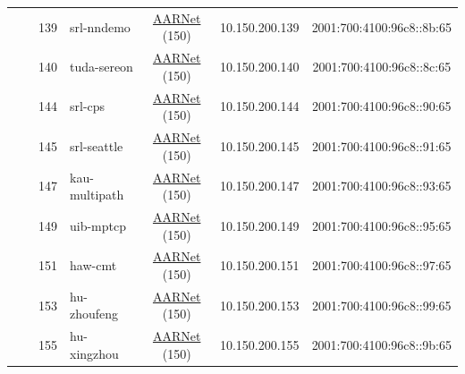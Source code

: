 \begin{small}
\begin{center}
\begin{longtable}{|c|c|c|c|c|c|c|c|}
  &  & \tiny{139} & \multicolumn{1}{|l|}{\tiny{srl-nndemo}} & \multicolumn{2}{|c|}{\tiny{\href{https://www.aarnet.edu.au/}{AARNet} (150)}} & \tiny{10.150.200.139} & \tiny{2001:700:4100:96c8::8b:65} \\* \cline{3-3}\cline{4-4}\cline{5-5}\cline{6-6}\cline{7-7}\cline{8-8}
  &  & \tiny{140} & \multicolumn{1}{|l|}{\tiny{tuda-sereon}} & \multicolumn{2}{|c|}{\tiny{\href{https://www.aarnet.edu.au/}{AARNet} (150)}} & \tiny{10.150.200.140} & \tiny{2001:700:4100:96c8::8c:65} \\* \cline{3-3}\cline{4-4}\cline{5-5}\cline{6-6}\cline{7-7}\cline{8-8}
  &  & \tiny{144} & \multicolumn{1}{|l|}{\tiny{srl-cps}} & \multicolumn{2}{|c|}{\tiny{\href{https://www.aarnet.edu.au/}{AARNet} (150)}} & \tiny{10.150.200.144} & \tiny{2001:700:4100:96c8::90:65} \\* \cline{3-3}\cline{4-4}\cline{5-5}\cline{6-6}\cline{7-7}\cline{8-8}
  &  & \tiny{145} & \multicolumn{1}{|l|}{\tiny{srl-seattle}} & \multicolumn{2}{|c|}{\tiny{\href{https://www.aarnet.edu.au/}{AARNet} (150)}} & \tiny{10.150.200.145} & \tiny{2001:700:4100:96c8::91:65} \\* \cline{3-3}\cline{4-4}\cline{5-5}\cline{6-6}\cline{7-7}\cline{8-8}
  &  & \tiny{147} & \multicolumn{1}{|l|}{\tiny{kau-multipath}} & \multicolumn{2}{|c|}{\tiny{\href{https://www.aarnet.edu.au/}{AARNet} (150)}} & \tiny{10.150.200.147} & \tiny{2001:700:4100:96c8::93:65} \\* \cline{3-3}\cline{4-4}\cline{5-5}\cline{6-6}\cline{7-7}\cline{8-8}
  &  & \tiny{149} & \multicolumn{1}{|l|}{\tiny{uib-mptcp}} & \multicolumn{2}{|c|}{\tiny{\href{https://www.aarnet.edu.au/}{AARNet} (150)}} & \tiny{10.150.200.149} & \tiny{2001:700:4100:96c8::95:65} \\* \cline{3-3}\cline{4-4}\cline{5-5}\cline{6-6}\cline{7-7}\cline{8-8}
  &  & \tiny{151} & \multicolumn{1}{|l|}{\tiny{haw-cmt}} & \multicolumn{2}{|c|}{\tiny{\href{https://www.aarnet.edu.au/}{AARNet} (150)}} & \tiny{10.150.200.151} & \tiny{2001:700:4100:96c8::97:65} \\* \cline{3-3}\cline{4-4}\cline{5-5}\cline{6-6}\cline{7-7}\cline{8-8}
  &  & \tiny{153} & \multicolumn{1}{|l|}{\tiny{hu-zhoufeng}} & \multicolumn{2}{|c|}{\tiny{\href{https://www.aarnet.edu.au/}{AARNet} (150)}} & \tiny{10.150.200.153} & \tiny{2001:700:4100:96c8::99:65} \\* \cline{3-3}\cline{4-4}\cline{5-5}\cline{6-6}\cline{7-7}\cline{8-8}
  &  & \tiny{155} & \multicolumn{1}{|l|}{\tiny{hu-xingzhou}} & \multicolumn{2}{|c|}{\tiny{\href{https://www.aarnet.edu.au/}{AARNet} (150)}} & \tiny{10.150.200.155} & \tiny{2001:700:4100:96c8::9b:65} \\* \cline{3-3}\cline{4-4}\cline{5-5}\cline{6-6}\cline{7-7}\cline{8-8}

\end{longtable}
\end{center}
\end{small}
